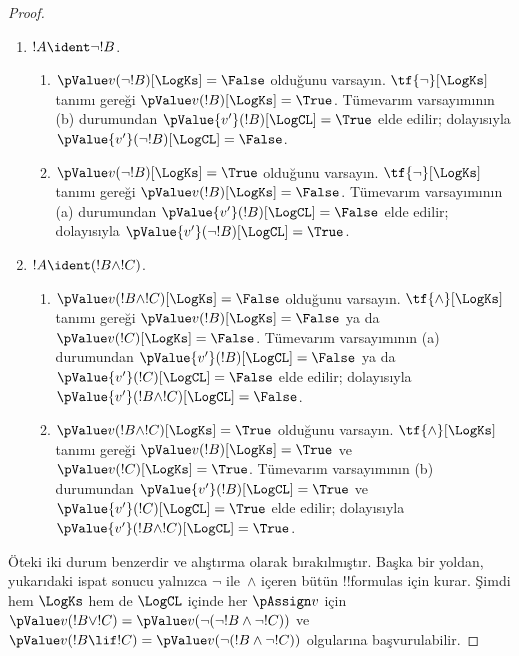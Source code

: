 \begin{proof}
\begin{enumerate}
    Tümevarım adımı için şu durumları ele alın:
    \item $!A \ident \lnot !B$. 
    \begin{enumerate}
      \item $\pValue v(\lnot!B)[\LogKs] = \False$ olduğunu varsayın.
      $\tf{\lnot}[\LogKs]$ tanımı gereği
      $\pValue v(!B)[\LogKs] = \True$. Tümevarım varsayımının (b) durumundan
      $\pValue {v'}(!B)[\LogCL] = \True$ elde edilir; dolayısıyla
      $\pValue {v'}(\lnot !B)[\LogCL] = \False$.
      \item $\pValue v(\lnot!B)[\LogKs] = \True$ olduğunu varsayın.
      $\tf{\lnot}[\LogKs]$ tanımı gereği
      $\pValue v(!B)[\LogKs] = \False$. Tümevarım varsayımının (a) durumundan
      $\pValue {v'}(!B)[\LogCL] = \False$ elde edilir; dolayısıyla
      $\pValue {v'}(\lnot !B)[\LogCL] = \True$.
    \end{enumerate}

    \item $!A \ident (!B \land !C)$.
    \begin{enumerate}
      \item $\pValue v(!B \land !C)[\LogKs] = \False$ olduğunu varsayın.
      $\tf{\land}[\LogKs]$ tanımı gereği
      $\pValue v(!B)[\LogKs] = \False$ ya da
      $\pValue v(!C)[\LogKs] = \False$. Tümevarım varsayımının (a)
      durumundan $\pValue {v'}(!B)[\LogCL] = \False$ ya da
      $\pValue {v'}(!C)[\LogCL] = \False$ elde edilir; dolayısıyla
      $\pValue {v'}(!B \land !C)[\LogCL] = \False$.
      \item $\pValue v(!B \land !C)[\LogKs] = \True$ olduğunu varsayın.
      $\tf{\land}[\LogKs]$ tanımı gereği
      $\pValue v(!B)[\LogKs] = \True$ ve
      $\pValue v(!C)[\LogKs] = \True$. Tümevarım varsayımının (b)
      durumundan $\pValue {v'}(!B)[\LogCL] = \True$ ve
      $\pValue {v'}(!C)[\LogCL] = \True$ elde edilir; dolayısıyla
      $\pValue {v'}(!B \land !C)[\LogCL] = \True$.
    \end{enumerate}
  \end{enumerate}

  Öteki iki durum benzerdir ve alıştırma olarak bırakılmıştır. Başka bir
  yoldan, yukarıdaki ispat sonucu yalnızca $\lnot$ ile~$\land$ içeren bütün
  !!{formula}s için kurar. Şimdi hem $\LogKs$ hem de $\LogCL$ içinde her
  $\pAssign v$ için $\pValue v(!B \lor !C) =
  \pValue v(\lnot(\lnot!B \land \lnot !C))$ ve
  $\pValue v(!B \lif !C) = \pValue v(\lnot(!B \land \lnot !C))$
  olgularına başvurulabilir.
\end{proof}

